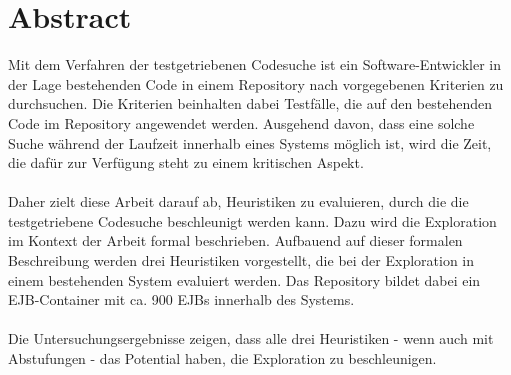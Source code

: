 \documentclass[a4paper,12pt]{book}
\begin{document}


\frontmatter

\section*{Abstract}
Mit dem Verfahren der testgetriebenen Codesuche ist ein Software-Entwickler in der Lage bestehenden Code in einem Repository nach vorgegebenen Kriterien zu durchsuchen. Die Kriterien beinhalten dabei Testfälle, die auf den bestehenden Code im Repository angewendet werden.  Ausgehend davon, dass eine solche Suche während der Laufzeit innerhalb eines Systems möglich ist, wird die Zeit, die dafür zur Verfügung steht zu einem kritischen Aspekt.
\\\\
Daher zielt diese Arbeit darauf ab, Heuristiken zu evaluieren, durch die die testgetriebene Codesuche beschleunigt werden kann. Dazu wird die Exploration im Kontext der Arbeit formal beschrieben. Aufbauend auf dieser formalen Beschreibung werden drei Heuristiken vorgestellt, die bei der Exploration in einem bestehenden System evaluiert werden. Das Repository bildet dabei ein EJB-Container mit ca. 900 EJBs innerhalb des Systems. 
\\\\
Die Untersuchungsergebnisse zeigen, dass alle drei Heuristiken - wenn auch mit Abstufungen - das Potential haben, die Exploration zu beschleunigen.
\newpage





\tableofcontents

{}
\listoffigures

{}
\listoftables

{}
\lstlistoflistings



\mainmatter









\newpage
\appendix
{}
\printglossaries








{}



%
%


%


\end{document}
